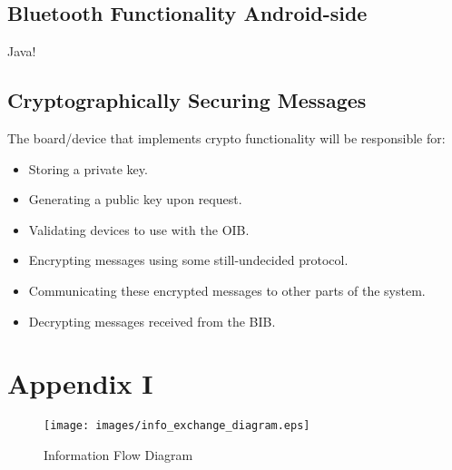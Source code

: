\documentclass[12pt,letterpaper]{article}
\begin{document}
\subsection{Bluetooth Functionality Android-side}
Java!

\subsection{Cryptographically Securing Messages}
The board/device that implements crypto functionality will be responsible for:

\begin{itemize}
	\item Storing a private key.
	\item Generating a public key upon request.
	\item Validating devices to use with the OIB.
	\item Encrypting messages using some still-undecided protocol.
	\item Communicating these encrypted messages to other parts of the system.
	\item Decrypting messages received from the BIB.
\end{itemize}

\newpage

\section{Appendix I}
\begin{figure}[!ht]
\centering
\texttt{[image: images/info\_exchange\_diagram.eps]}
\caption{Information Flow Diagram}
\label{fig: image}
\end{figure}
\end{document}
